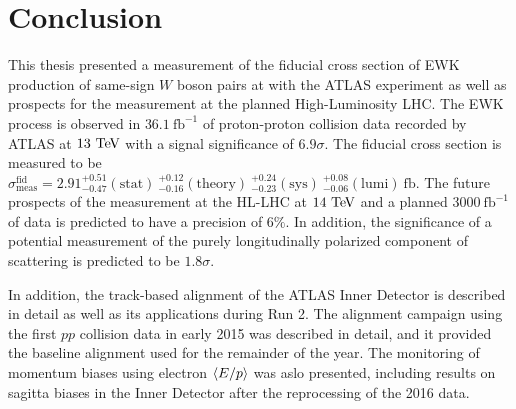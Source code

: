\chapter[Conclusion][Conclusion]{Conclusion}

This thesis presented a measurement of the fiducial cross section of EWK production of same-sign $W$ boson pairs at  with the ATLAS experiment as well as prospects for the measurement at the planned High-Luminosity LHC.
The \ssww EWK process is observed in $36.1~\textrm{fb}^{-1}$ of proton-proton collision data recorded by ATLAS at $13\tev$ with a signal significance of $6.9\sigma$.
The fiducial cross section is measured to be $\sigma_{\textrm{meas}}^{\textrm{fid}} = 2.91^{+0.51}_{-0.47}(\textrm{stat})~^{+0.12}_{-0.16}(\textrm{theory})~^{+0.24}_{-0.23}(\textrm{sys})~^{+0.08}_{-0.06}(\textrm{lumi})~\textrm{fb}$.
The future prospects of the measurement at the HL-LHC at $14\tev$ and a planned $3000~\textrm{fb}^{-1}$ of data is predicted to have a precision of $6\%$.
In addition, the significance of a potential measurement of the purely longitudinally polarized component of \sswwnojj scattering is predicted to be $1.8\sigma$.

In addition, the track-based alignment of the ATLAS Inner Detector is described in detail as well as its applications during Run 2.
The alignment campaign using the first  $pp$ collision data in early 2015 was described in detail, and it provided the baseline alignment used for the remainder of the year.
The monitoring of momentum biases using electron $\langle E/p\rangle$ was aslo presented, including results on sagitta biases in the Inner Detector after the reprocessing of the 2016 data.

%
